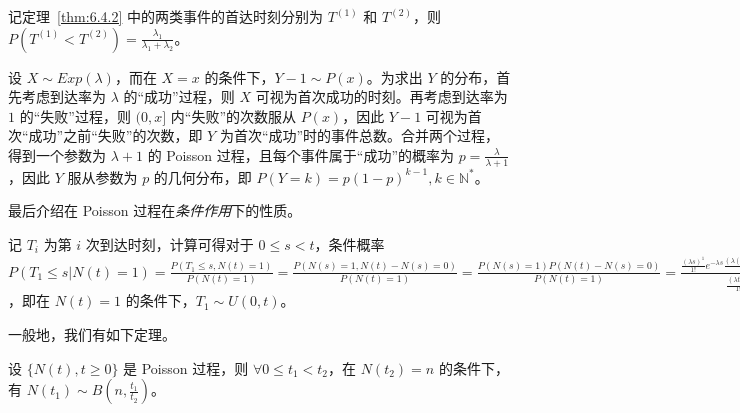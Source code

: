 \documentclass[../main.tex]{subfiles}
\begin{document}
\begin{theorem}\label{thm:6.4.3}
    记定理~\ref{thm:6.4.2} 中的两类事件的首达时刻分别为 $T^{(1)}$ 和 $T^{(2)}$，则 $P(T^{(1)}<T^{(2)})=\frac{\lambda_1}{\lambda_1+\lambda_2}$。
\end{theorem}

\begin{example}
    设 $X\sim Exp(\lambda)$，而在 $X=x$ 的条件下，$Y-1\sim P(x)$。为求出 $Y$ 的分布，首先考虑到达率为 $\lambda$ 的“成功”过程，则 $X$ 可视为首次成功的时刻。再考虑到达率为 $1$ 的“失败”过程，则 $(0,x]$ 内“失败”的次数服从 $P(x)$，因此 $Y-1$ 可视为首次“成功”之前“失败”的次数，即 $Y$ 为首次“成功”时的事件总数。合并两个过程，得到一个参数为 $\lambda+1$ 的 Poisson 过程，且每个事件属于“成功”的概率为 $p=\frac{\lambda}{\lambda+1}$，因此 $Y$ 服从参数为 $p$ 的几何分布，即 $P(Y=k)=p(1-p)^{k-1},k\in\mathbb N^*$。
\end{example}

最后介绍在 Poisson 过程在\emph{条件作用}下的性质。

记 $T_i$ 为第 $i$ 次到达时刻，计算可得对于 $0\leq s<t$，条件概率 $P(T_1\leq s|N(t)=1)=\frac{P(T_1\leq s,N(t)=1)}{P(N(t)=1)}=\frac{P(N(s)=1,N(t)-N(s)=0)}{P(N(t)=1)}=\frac{P(N(s)=1)P(N(t)-N(s)=0)}{P(N(t)=1)}=\frac{\frac{(\lambda s)^1}{1!}e^{-\lambda s}\frac{(\lambda(t-s))^0}{0!}e^{-\lambda(t-s)}}{\frac{(\lambda t)^1}{1!}e^{-\lambda t}}=\frac st$，即在 $N(t)=1$ 的条件下，$T_1\sim U(0,t)$。

一般地，我们有如下定理。

\begin{theorem}\label{thm:6.4.4}
    设 $\{N(t),t\geq0\}$ 是 Poisson 过程，则 $\forall 0\leq t_1<t_2$，在 $N(t_2)=n$ 的条件下，有 $N(t_1)\sim B(n,\frac{t_1}{t_2})$。
\end{theorem}
\end{document}
